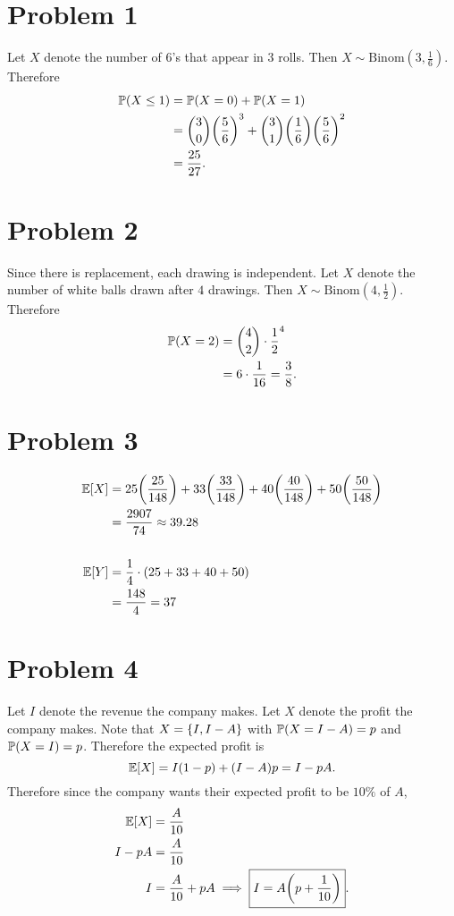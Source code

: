 \documentclass[12pt]{extarticle}
\begin{document}
\section*{Problem 1}
Let $X$ denote the number of $6$'s that appear in $3$ rolls. Then $X \sim \text{Binom}(3, \frac{1}{6})$. Therefore
\begin{align*}
	\mathbb{P}\qty(X \leq 1) &= \mathbb{P}\qty(X = 0) + \mathbb{P}\qty(X = 1) \\
									&= \binom{3}{0}\qty(\frac{5}{6})^3 + \binom{3}{1}\qty(\frac{1}{6})\qty(\frac{5}{6})^2 \\
									&= \frac{25}{27}
.\end{align*}

\section*{Problem 2}
Since there is replacement, each drawing is independent. Let $X$ denote the number of white balls drawn after $4$ drawings. Then $X \sim \text{Binom}(4, \frac{1}{2})$. Therefore
\begin{align*}
	\mathbb{P}\qty(X = 2) &= \binom{4}{2} \cdot \frac{1}{2}^4 \\
							 &= 6 \cdot \frac{1}{16} = \frac{3}{8}
.\end{align*}

\section*{Problem 3}
\begin{align*}
	\mathbb{E}\qty[X] &= 25\qty(\frac{25}{148}) + 33\qty(\frac{33}{148}) + 40\qty(\frac{40}{148}) + 50\qty(\frac{50}{148}) \\
					&= \frac{2907}{74} \approx 39.28 \\
					\\
	\mathbb{E}\qty[Y] &= \frac{1}{4} \cdot (25 + 33 + 40 + 50) \\
	&= \frac{148}{4} = 37
\end{align*}

\section*{Problem 4}
Let $I$ denote the revenue the company makes. Let $X$ denote the profit the company makes. Note that $X = \qty{I, I - A}$ with $\mathbb{P}\qty(X = I-A) = p$ and $\mathbb{P}\qty(X = I) = p$. Therefore the expected profit is
\[
	\mathbb{E}\qty[X] = I (1-p) + (I - A)p = I - pA
.\]
Therefore since the company wants their expected profit to be $10\%$ of $A$,
\begin{align*}
	\mathbb{E}\qty[X] &= \frac{A}{10} \\
	I - pA &= \frac{A}{10} \\
	I &= \frac{A}{10} + pA \implies \boxed{I = A\qty(p + \frac{1}{10})}
.\end{align*}
\end{document}
